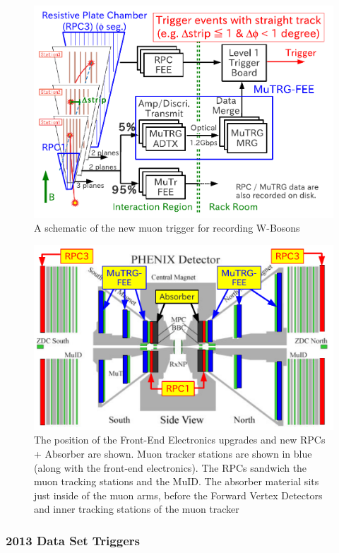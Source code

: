 \begin{figure}[ht]
  \centering
  \includegraphics[width=0.8\linewidth]{./figures/new_muon_trigger.png}
  \caption{
    A schematic of the new muon trigger for recording
    W-Bosons~\cite{Fukao2011}
  }
  \label{fig:new_muon_trigger}
\end{figure}

\begin{figure}[ht]
  \centering
  \includegraphics[width=0.8\linewidth]{./figures/muon_arms_upgrades.png}
  \caption{
    The position of the Front-End Electronics upgrades and new RPCs + Absorber
    are shown. Muon tracker stations are shown in blue (along with the front-end
    electronics). The RPCs sandwich the muon tracking stations and the MuID.
    The absorber material sits just inside of the muon arms, before the Forward
    Vertex Detectors and inner tracking stations of the muon
    tracker~\cite{Fukao2011}
  }
  \label{fig:muon_arms_upgrades}

\end{figure}

\subsubsection{2013 Data Set Triggers}

